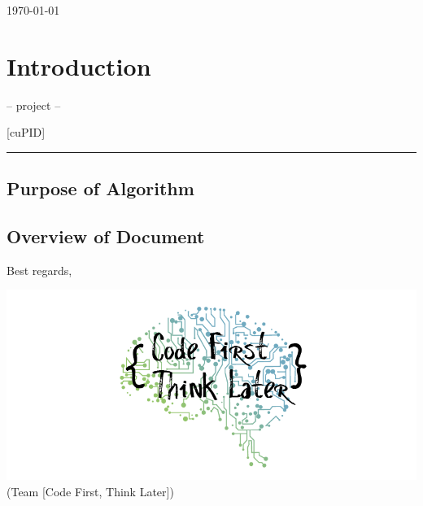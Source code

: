 \documentclass[12pt,letterpaper]{article}
\begin{document}
\vspace{2em}

\begin{center}
	\today
\end{center}

\newpage{}

\tableofcontents{}

\renewcommand{\listfigurename}{Figures}
\listoffigures

\renewcommand{\listtablename}{Tables}
\listoftables

\newpage{}

\section{Introduction}

\begin{center}
    -- project --
\end{center}

\begin{center}
	\Huge [cuPID]
\end{center}

\begin{center}
    \rule{0.85\textwidth}{0.5pt}
\end{center}

\subsection{Purpose of Algorithm}

\subsection{Overview of Document}

\vspace{1em}

\noindent Best regards,

\vspace{1em}

\begin{center}
	\includegraphics[scale=0.4]{imgs/logo.png} \\ \footnotesize{(Team [Code First, Think Later])}
\end{center}
\end{document}
